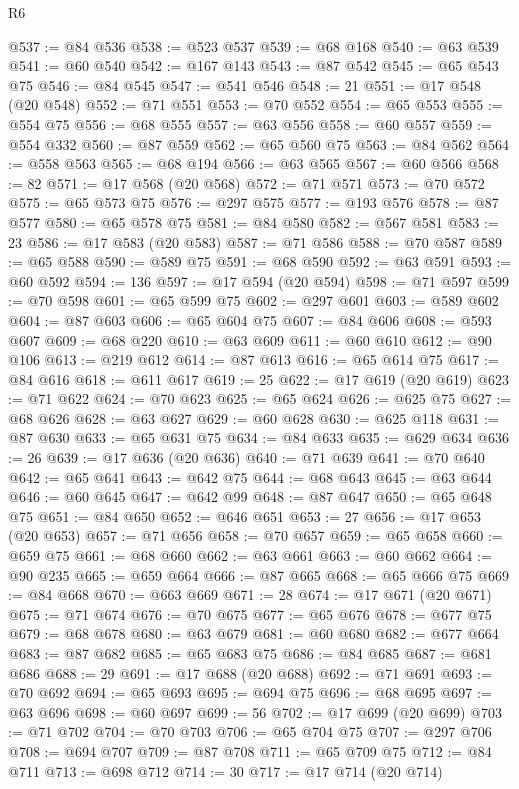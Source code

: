 \begin{lexlean}{R6}
\begin{coremodule}
@537 := @84 @536
@538 := @523 @537
@539 := @68 @168
@540 := @63 @539
@541 := @60 @540
@542 := @167 @143
@543 := @87 @542
@545 := @65 @543 @75
@546 := @84 @545
@547 := @541 @546
@548 := 21
@551 := @17 @548 (@20 @548)
@552 := @71 @551
@553 := @70 @552
@554 := @65 @553
@555 := @554 @75
@556 := @68 @555
@557 := @63 @556
@558 := @60 @557
@559 := @554 @332
@560 := @87 @559
@562 := @65 @560 @75
@563 := @84 @562
@564 := @558 @563
@565 := @68 @194
@566 := @63 @565
@567 := @60 @566
@568 := 82
@571 := @17 @568 (@20 @568)
@572 := @71 @571
@573 := @70 @572
@575 := @65 @573 @75
@576 := @297 @575
@577 := @193 @576
@578 := @87 @577
@580 := @65 @578 @75
@581 := @84 @580
@582 := @567 @581
@583 := 23
@586 := @17 @583 (@20 @583)
@587 := @71 @586
@588 := @70 @587
@589 := @65 @588
@590 := @589 @75
@591 := @68 @590
@592 := @63 @591
@593 := @60 @592
@594 := 136
@597 := @17 @594 (@20 @594)
@598 := @71 @597
@599 := @70 @598
@601 := @65 @599 @75
@602 := @297 @601
@603 := @589 @602
@604 := @87 @603
@606 := @65 @604 @75
@607 := @84 @606
@608 := @593 @607
@609 := @68 @220
@610 := @63 @609
@611 := @60 @610
@612 := @90 @106
@613 := @219 @612
@614 := @87 @613
@616 := @65 @614 @75
@617 := @84 @616
@618 := @611 @617
@619 := 25
@622 := @17 @619 (@20 @619)
@623 := @71 @622
@624 := @70 @623
@625 := @65 @624
@626 := @625 @75
@627 := @68 @626
@628 := @63 @627
@629 := @60 @628
@630 := @625 @118
@631 := @87 @630
@633 := @65 @631 @75
@634 := @84 @633
@635 := @629 @634
@636 := 26
@639 := @17 @636 (@20 @636)
@640 := @71 @639
@641 := @70 @640
@642 := @65 @641
@643 := @642 @75
@644 := @68 @643
@645 := @63 @644
@646 := @60 @645
@647 := @642 @99
@648 := @87 @647
@650 := @65 @648 @75
@651 := @84 @650
@652 := @646 @651
@653 := 27
@656 := @17 @653 (@20 @653)
@657 := @71 @656
@658 := @70 @657
@659 := @65 @658
@660 := @659 @75
@661 := @68 @660
@662 := @63 @661
@663 := @60 @662
@664 := @90 @235
@665 := @659 @664
@666 := @87 @665
@668 := @65 @666 @75
@669 := @84 @668
@670 := @663 @669
@671 := 28
@674 := @17 @671 (@20 @671)
@675 := @71 @674
@676 := @70 @675
@677 := @65 @676
@678 := @677 @75
@679 := @68 @678
@680 := @63 @679
@681 := @60 @680
@682 := @677 @664
@683 := @87 @682
@685 := @65 @683 @75
@686 := @84 @685
@687 := @681 @686
@688 := 29
@691 := @17 @688 (@20 @688)
@692 := @71 @691
@693 := @70 @692
@694 := @65 @693
@695 := @694 @75
@696 := @68 @695
@697 := @63 @696
@698 := @60 @697
@699 := 56
@702 := @17 @699 (@20 @699)
@703 := @71 @702
@704 := @70 @703
@706 := @65 @704 @75
@707 := @297 @706
@708 := @694 @707
@709 := @87 @708
@711 := @65 @709 @75
@712 := @84 @711
@713 := @698 @712
@714 := 30
@717 := @17 @714 (@20 @714)

\end{coremodule}
\end{lexlean}
